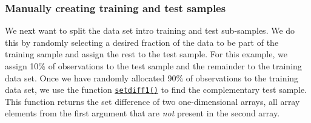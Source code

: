 \documentclass{scrartcl}
\begin{document}
    \hypertarget{manually-creating-training-and-test-samples}{%
\subsubsection*{Manually creating training and test
samples}\label{manually-creating-training-and-test-samples}}

We next want to split the data set intro training and test sub-samples.
We do this by randomly selecting a desired fraction of the data to be
part of the training sample and assign the rest to the test sample. For
this example, we assign 10\% of observations to the test sample and the
remainder to the training data set. Once we have randomly allocated 90\%
of observations to the training data set, we use the function
\href{https://numpy.org/doc/stable/reference/generated/numpy.setdiff1d.html}{\texttt{setdiff1()}}
to find the complementary test sample. This function returns the set
difference of two one-dimensional arrays, \ie all array elements from
the first argument that are \emph{not} present in the second array.
\end{document}
